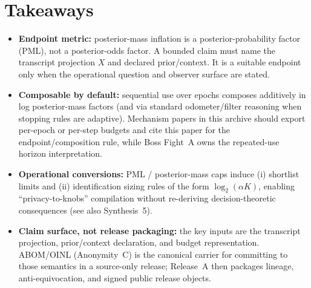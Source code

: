 \documentclass[11pt]{article}
\theoremstyle{definition}
\theoremstyle{remark}
\begin{document}
\section{Takeaways}
\begin{itemize}[leftmargin=*]
\item \textbf{Endpoint metric:} posterior-mass inflation is a posterior-probability factor (PML), not a posterior-odds factor. A bounded claim must name the transcript projection $X$ and declared prior/context. It is a suitable endpoint only when the operational question and observer surface are stated.
\item \textbf{Composable by default:} sequential use over epochs composes additively in log posterior-mass factors (and via standard odometer/filter reasoning when stopping rules are adaptive). Mechanism papers in this archive should export per-epoch or per-step budgets and cite this paper for the endpoint/composition rule, while Boss Fight~A owns the repeated-use horizon interpretation.\cite{series:bossfightA}
\item \textbf{Operational conversions:} PML / posterior-mass caps induce (i) shortlist limits and (ii) identification sizing rules of the form $\log_2(\alpha K)$, enabling ``privacy-to-knobs'' compilation without re-deriving decision-theoretic consequences (see also Synthesis~5).\cite{series:endpointbridge}
\item \textbf{Claim surface, not release packaging:} the key inputs are the transcript projection, prior/context declaration, and budget representation. ABOM/OINL (Anonymity~C) is the canonical carrier for committing to those semantics in a source-only release; Release~A then packages lineage, anti-equivocation, and signed public release objects.\cite{series:abomoinl,series:releaseA}
\end{itemize}
\end{document}
